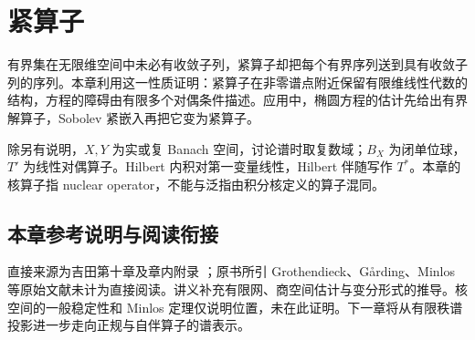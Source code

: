 \chapter{紧算子}\label{ch:yosida-10}

有界集在无限维空间中未必有收敛子列，紧算子却把每个有界序列送到具有收敛子列的序列。本章利用这一性质证明：紧算子在非零谱点附近保留有限维线性代数的结构，方程的障碍由有限多个对偶条件描述。应用中，椭圆方程的估计先给出有界解算子，Sobolev 紧嵌入再把它变为紧算子。

除另有说明，$X,Y$ 为实或复 Banach 空间，讨论谱时取复数域；$B_X$ 为闭单位球，$T'$ 为线性对偶算子。Hilbert 内积对第一变量线性，Hilbert 伴随写作 $T^*$。本章的核算子指 nuclear operator，不能与泛指由积分核定义的算子混同。









\section*{本章参考说明与阅读衔接}
直接来源为吉田第十章及章内附录 \cite{yosida-zh,yosida-en}；原书所引 Grothendieck、Gårding、Minlos 等原始文献未计为直接阅读。讲义补充有限网、商空间估计与变分形式的推导。核空间的一般稳定性和 Minlos 定理仅说明位置，未在此证明。下一章将从有限秩谱投影进一步走向正规与自伴算子的谱表示。
